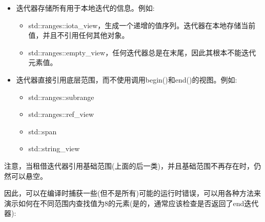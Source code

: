 \begin{itemize}
\item
迭代器存储所有用于本地迭代的信息。例如:

\begin{itemize}
\item
std::ranges::iota\_view，生成一个递增的值序列。迭代器在本地存储当前值，并且不引用任何其他对象。

\item
std::ranges::empty\_view，任何迭代器总是在末尾，因此其根本不能迭代元素值。
\end{itemize}

\item
迭代器直接引用底层范围，而不使用调用begin()和end()的视图。例如:

\begin{itemize}
\item
std::ranges::subrange

\item
std::ranges::ref\_view

\item
std::span

\item
std::string\_view
\end{itemize}
\end{itemize}

注意，当租借迭代器引用基础范围(上面的后一类)，并且基础范围不再存在时，仍然可以悬空。

因此，可以在编译时捕获一些(但不是所有)可能的运行时错误，可以用各种方法来演示如何在不同范围内查找值为8的元素(是的，通常应该检查是否返回了end迭代器):

